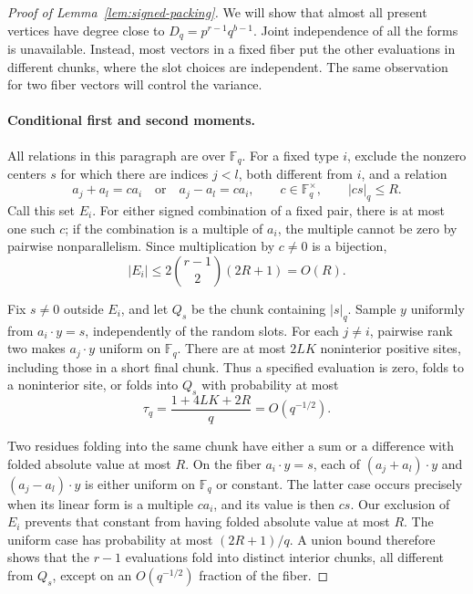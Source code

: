 \begin{proof}[Proof of Lemma~\ref{lem:signed-packing}]
We will show that almost all present vertices have degree close to
$D_q=p^{r-1}q^{b-1}$.  Joint independence of all the forms is unavailable.
Instead, most vectors in a fixed fiber put the other evaluations in
different chunks, where the slot choices are independent.  The same
observation for two fiber vectors will control the variance.

\paragraph{Conditional first and second moments.}
All relations in this paragraph are over $\mathbb F_q$.  For a fixed
type $i$, exclude the nonzero centers $s$ for which there are indices
$j<l$, both different from $i$, and a relation
\begin{equation}
 a_j+a_l=c a_i\quad\text{or}\quad a_j-a_l=c a_i,
 \qquad c\in\mathbb F_q^{\times},\qquad |cs|_q\le R.
 \label{eq:packing-exceptional-relation}
\end{equation}
Call this set $E_i$.  For either signed combination of a fixed pair,
there is at most one such $c$; if the combination is a multiple of
$a_i$, the multiple cannot be zero by pairwise nonparallelism.  Since
multiplication by $c\ne0$ is a bijection,
\begin{equation}
 |E_i|\le 2\binom{r-1}{2}(2R+1)=O(R).
 \label{eq:packing-exception-count}
\end{equation}

Fix $s\ne0$ outside $E_i$, and let $Q_s$ be the chunk containing
$|s|_q$.  Sample $y$ uniformly from $a_i\cdot y=s$, independently of
the random slots.  For each $j\ne i$, pairwise rank two makes
$a_j\cdot y$ uniform on $\mathbb F_q$.  There are at most $2LK$
noninterior positive sites, including those in a short final chunk.
Thus a specified evaluation is zero, folds to a noninterior site, or
folds into $Q_s$ with probability at most
\begin{equation}
 \tau_q=\frac{1+4LK+2R}{q}=O(q^{-1/2}).
 \label{eq:packing-boundary-probability}
\end{equation}

Two residues folding into the same chunk have either a sum or a
difference with folded absolute value at most $R$.  On the fiber
$a_i\cdot y=s$, each of $(a_j+a_l)\cdot y$ and
$(a_j-a_l)\cdot y$ is either uniform on $\mathbb F_q$ or constant.
The latter case occurs precisely when its linear form is a multiple
$c a_i$, and its value is then $cs$.  Our exclusion of $E_i$ prevents
that constant from having folded absolute value at most $R$.
The uniform case has probability at most $(2R+1)/q$.  A union bound
therefore shows that the $r-1$ evaluations fold into distinct interior
chunks, all different from $Q_s$, except on an $O(q^{-1/2})$ fraction
of the fiber.


\end{proof}
